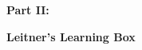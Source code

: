 
\vspace*{2cm}

{\bf \huge Part II:}
\vspace{1cm}

{\bf \Huge Leitner's Learning Box }
\vspace{1cm}






